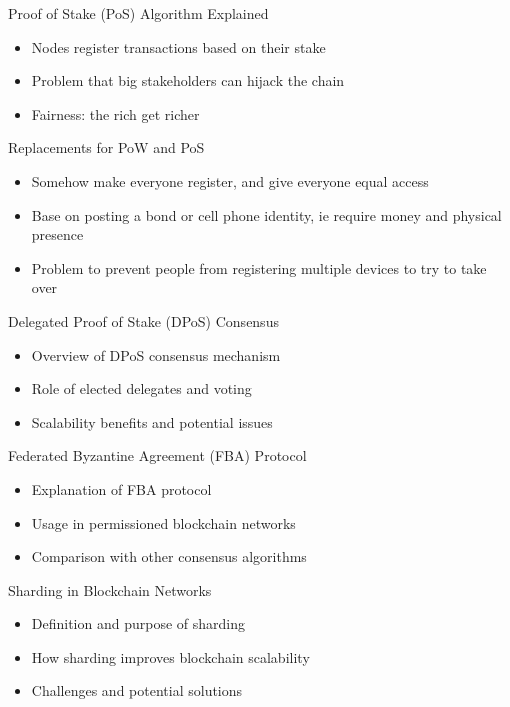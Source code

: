 \begin{frame}{Proof of Stake (PoS) Algorithm Explained}
    \begin{itemize}
        \item Nodes register transactions based on their stake
        \item Problem that big stakeholders can hijack the chain
        \item Fairness: the rich get richer
    \end{itemize}
\end{frame}

\begin{frame}{Replacements for PoW and PoS}
    \begin{itemize}
        \item Somehow make everyone register, and give everyone equal access
        \item Base on posting a bond or cell phone identity, ie require money and physical presence
        \item Problem to prevent people from registering multiple devices to try to take over
    \end{itemize}
\end{frame}

\begin{frame}{Delegated Proof of Stake (DPoS) Consensus}
    \begin{itemize}
        \item Overview of DPoS consensus mechanism
        \item Role of elected delegates and voting
        \item Scalability benefits and potential issues
    \end{itemize}
\end{frame}

\begin{frame}{Federated Byzantine Agreement (FBA) Protocol}
    \begin{itemize}
        \item Explanation of FBA protocol
        \item Usage in permissioned blockchain networks
        \item Comparison with other consensus algorithms
    \end{itemize}
\end{frame}

\begin{frame}{Sharding in Blockchain Networks}
    \begin{itemize}
        \item Definition and purpose of sharding
        \item How sharding improves blockchain scalability
        \item Challenges and potential solutions
    \end{itemize}
\end{frame}

